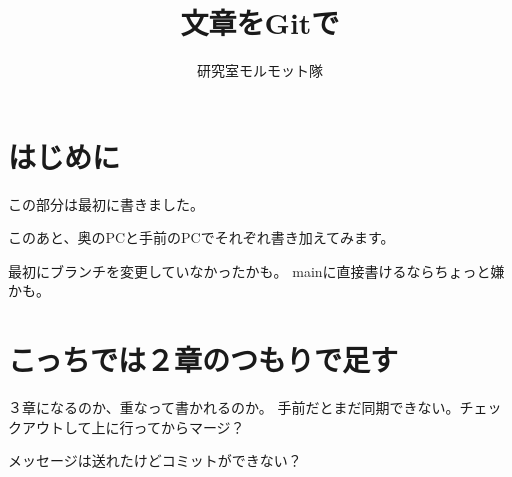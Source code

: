 \documentclass[a4j]{ujarticle}
\title{文章をGitで}
\author{研究室モルモット隊}
\begin{document}
\maketitle
\tableofcontents

\section{はじめに}
この部分は最初に書きました。

このあと、奥のPCと手前のPCでそれぞれ書き加えてみます。

最初にブランチを変更していなかったかも。
mainに直接書けるならちょっと嫌かも。

\section{こっちでは２章のつもりで足す}
３章になるのか、重なって書かれるのか。
手前だとまだ同期できない。チェックアウトして上に行ってからマージ？

メッセージは送れたけどコミットができない？
\end{document}

